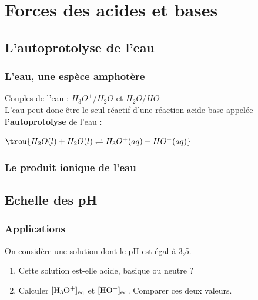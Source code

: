 \setcounter{chapter}{7}
\chapter{Forces des acides et bases}

\section{L'autoprotolyse de l'eau}
\subsection{L'eau, une espèce amphotère}

Couples de l'eau : $H_3O^+/H_2O$ et $H_2O/HO^-$\\
L'eau peut donc être le seul réactif d'une réaction acide base appelée \textbf{l'autoprotolyse} de l'eau :

\begin{center}
$\trou{H_2O(l) + H_2O(l) \rightleftharpoons H_3O^+(aq) +HO^{-}(aq)}$	
\end{center}

\subsection{Le produit ionique de l'eau}



\section{Echelle des pH}

\subsection{Applications}
On considère une solution dont le pH est égal à 3,5. 
\begin{enumerate}
	\item Cette solution est-elle acide, basique ou neutre ?
	\item Calculer $\rm[H_3O^+]_{eq}$ et $\rm[HO^-]_{eq}$. Comparer ces deux valeurs.
\end{enumerate}

